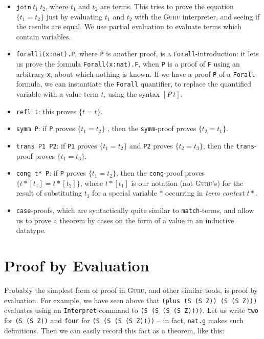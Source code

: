 \documentclass{book}[12pt]
\newcommand{\guru}[0]{\textsc{Guru}\xspace}
\begin{document}
\begin{itemize}

\item $\texttt{join}\ t_1\ t_2$, where $t_1$ and $t_2$ are terms.
This tries to prove the equation $\{ t_1 = t_2 \}$ just by evaluating
$t_1$ and $t_2$ with the \guru interpreter, and seeing if the results
are equal.  We use partial evaluation to evaluate terms which contain
variables.

\item \texttt{foralli(x:nat).P}, where \texttt{P} is another proof, is
a \texttt{Forall}-introduction: it lets us prove
the formula \texttt{Forall(x:nat).F}, when \texttt{P} is a proof of \texttt{F}
using an arbitrary \texttt{x}, about which nothing is known.  If we
have a proof \texttt{P} of a \texttt{Forall}-formula, we can
instantiate the \texttt{Forall} quantifier, to replace the quantified
variable with a value term $t$, using the syntax $[P\ t]$.

\item \texttt{refl t}: this proves $\{ t = t \}$.

\item \texttt{symm P}: if \texttt{P} proves $\{ t_1 = t_2 \}$ , then
the \texttt{symm}-proof proves $\{ t_2 = t_1 \}$.

\item \texttt{trans P1 P2}: if \texttt{P1} proves $\{ t_1 = t_2 \}$ and
\texttt{P2} proves $\{ t_2 = t_3 \}$, then the \texttt{trans}-proof proves
$\{ t_1 = t_3 \}$.

\item \texttt{cong t* P}: if \texttt{P} proves $\{ t_1 = t_2 \}$, then
the \texttt{cong}-proof proves $\{ t*[t_1] = t*[t_2]\}$, where $t*[t_1]$
is our notation (not \guru's) for the result of substituting $t_1$ for
a special variable $*$ occurring in \emph{term context} $t*$.

\item \texttt{case}-proofs, which are syntactically quite similar
to \texttt{match}-terms, and allow us to prove a theorem by cases
on the form of a value in an inductive datatype.

\end{itemize}

\section{Proof by Evaluation}
\label{ch3:eval}

Probably the simplest form of proof in \guru, and other similar tools,
is proof by evaluation.  For example, we have seen above that
\texttt{(plus (S (S Z)) (S (S Z)))} evaluates using an
\texttt{Interpret}-command to \texttt{(S (S (S (S Z))))}.  Let us
write \texttt{two} for \texttt{(S (S Z))} and \texttt{four} for
\texttt{(S (S (S (S Z))))} -- in fact, \texttt{nat.g} makes such
definitions.  Then we can easily record this fact as a theorem, like
this:
\end{document}
